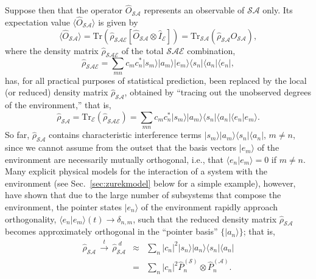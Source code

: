 \documentclass[twocolumn,rmp,aps,amsmath,amsfonts,noshowkeys,noshowpacs]{revtex4}
\newcommand{\ket}[1]{\ensuremath{|{#1\rangle}}}
\newcommand{\bra}[1]{\ensuremath{{\langle #1}|}}
\begin{document}
Suppose then that the operator $\widehat{O}_\mathcal{SA}$ represents
an observable of $\mathcal{SA}$ only.  Its expectation value $\langle
\widehat{O}_\mathcal{SA} \rangle $ is given by
%
\begin{equation} \label{eq:global-to-local} 
\langle
\widehat{O}_{\mathcal{SA}} \rangle = \text{Tr}
(\widehat{\rho}_\mathcal{SAE}
[\widehat{O}_\mathcal{SA} \otimes
\widehat{I}_\mathcal{E}]) = \text{Tr}_\mathcal{SA}
(\widehat{\rho}_\mathcal{SA}
\widehat{O}_\mathcal{SA}), 
\end{equation}
%
where the density matrix $\widehat{\rho}_{\mathcal{SAE}}$ of the total
$\mathcal{SAE}$ combination,
%
\begin{equation} \widehat{\rho}_{\mathcal{SAE}} = \sum_{mn} c_m c_n^*
\ket{s_m} \ket{a_m} \ket{e_m}
\bra{s_n} \bra{a_n} \bra{e_n}, \end{equation}
%
has, for all practical purposes of statistical prediction, been
replaced by the local (or reduced) density matrix
$\widehat{\rho}_{\mathcal{SA}}$, obtained by ``tracing out
the unobserved degrees of the environment,'' that is,
%
\begin{equation} \label{eq:rho-S+A} \widehat{\rho}_\mathcal{SA} =
\mathrm{Tr}_\mathcal{E} (\widehat{\rho}_\mathcal{SAE})
= \sum_{mn} c_m c_n^* \ket{s_m} \ket{a_m} \bra{s_n}\bra{a_n}
\langle e_n | e_m \rangle.  
\end{equation}
%
So far, $\widehat{\rho}_{\mathcal{SA}}$ contains characteristic
interference terms $\ket{s_m} \ket{a_m} \bra{s_n}\bra{a_n}$, $m \not=
n$, since we cannot assume from the outset that the basis vectors
$\ket{e_m}$ of the environment are necessarily mutually orthogonal,
i.e., that $\langle e_n | e_m \rangle = 0$ if $m \not= n$. Many
explicit physical models for the interaction of a system with the
environment (see Sec.~\ref{sec:zurekmodel} below for a simple
example), however, have shown that due to the large number of
subsystems that compose the environment, the pointer states
$\ket{e_n}$ of the environment rapidly approach orthogonality,
$\langle e_n | e_m \rangle (t) \rightarrow \delta_{n,m}$, such that
the reduced density matrix $\widehat{\rho}_{\mathcal{SA}}$ becomes
approximately orthogonal in the ``pointer basis'' $\{ \ket{a_n} \}$;
that is,
%
\begin{eqnarray} \label{eq:rho-S+A-diagonal} 
\widehat{\rho}_{\mathcal{SA}} \,
\stackrel{t}{\longrightarrow} \, \widehat{\rho}^{\,\,d}_{\mathcal{SA}}
& \approx &
\sum_n |c_n|^2 \ket{s_n} \ket{a_n}
\bra{s_n} \bra{a_n} \nonumber \\ &=& \sum_n |c_n|^2
\widehat{P}^{(\mathcal{S})}_n \otimes \widehat{P}^{(\mathcal{A})}_n. 
\end{eqnarray}
\end{document}

